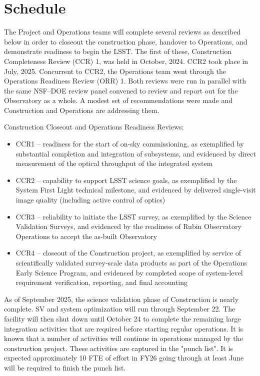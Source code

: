 \section{Schedule}{\label{secSched}}



The Project and Operations teams will complete several reviews as described below in order to closeout the construction phase, handover to Operations, and demonstrate readiness to begin the LSST. The first of these, Construction Completeness Review (CCR) 1, was held in October, 2024. CCR2 took place in July, 2025. Concurrent to CCR2, the Operations team went through the Operations Readiness Review (ORR) 1. Both reviews were run in parallel with the same NSF--DOE review panel convened to review and report out for the Observatory as a whole. A modest set of recommendations were made and Construction and Operations are addressing them. 

Construction Closeout and Operations Readiness Reviews:

\begin{itemize}
\item CCR1 -- readiness for the start of on-sky commissioning, as exemplified by substantial completion and integration of subsystems, and evidenced by direct measurement of the optical throughput of the integrated system

\item CCR2 -- capability to support LSST science goals, as exemplified by the System First Light technical milestone, and evidenced by delivered single-visit image quality (including active control of optics)

\item CCR3 -- reliability to initiate the LSST survey, as exemplified by the Science Validation Surveys, and evidenced by the readiness of Rubin Observatory Operations to accept the as-built Observatory

\item CCR4 -- closeout of the Construction project, as exemplified by service of scientifically validated survey-scale data products as part of the Operations Early Science Program, and evidenced by completed scope of system-level requirement verification, reporting, and final accounting
\end{itemize}

As of September 2025, the science validation phase of Construction is nearly complete. SV and system optimization will run through September 22. The facility will then shut down until October 24 to complete the remaining large integration activities that are required before starting regular operations. It is known that a number of activities will continue in operations managed by the construction project. These activities are captured in the "punch list". It is expected approximately 10 FTE of effort in FY26 going through at least June will be required to finish the punch list. 

